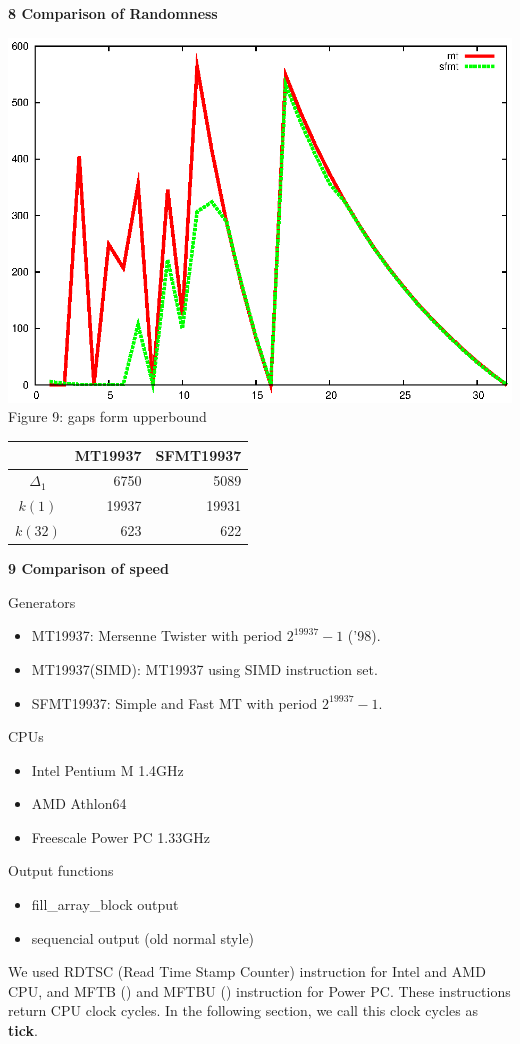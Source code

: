 \documentclass[a4j,12pt,landscape]{jarticle}
\begin{document}
\newpage
{\bf 8 Comparison of Randomness}
\begin{center}
\includegraphics[width=0.7\linewidth,height=0.6\textheight,
keepaspectratio]{delta.eps}
\\
Figure 9: gaps form upperbound
\end{center}
\begin{center}
\LARGE
\begin{tabular}{crr} \hline
  & MT19937 & SFMT19937 \\ \hline\hline
  $\Delta_1$ & 6750 & 5089 \\
  $k(1)$ & 19937 & 19931 \\
  $k(32)$ & 623 & 622 \\ \hline
\end{tabular}
\end{center}
\newpage
\noindent
{\bf 9 Comparison of speed}
\begin{description}
  \item Generators
    \begin{itemize}
    \item MT19937: Mersenne Twister with period $2^{19937}-1$ ('98).
    \item MT19937(SIMD): MT19937 using SIMD instruction set.
    \item SFMT19937: Simple and Fast MT with period $2^{19937}-1$.
    \end{itemize}
  \item CPUs
    \begin{itemize}
    \item Intel Pentium M 1.4GHz
    \item AMD Athlon64 
    \item Freescale Power PC 1.33GHz
    \end{itemize}
  \item Output functions
    \begin{itemize}
    \item fill\_array\_block output
    \item sequencial output (old normal style)
    \end{itemize}
  \end{description}
\newpage
We used RDTSC (Read Time Stamp Counter) instruction for Intel and AMD CPU,
and MFTB () and MFTBU () instruction for Power PC.
These instructions return CPU clock cycles.
In the following section, we call this clock cycles as {\bf tick}.
\end{document}
